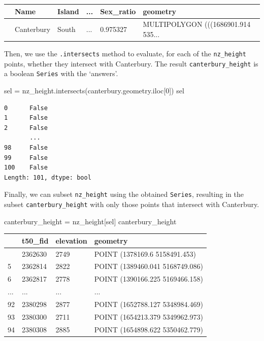 \documentclass[
  letterpaper,
]{krantz}
\newenvironment{Shaded}{\begin{snugshade}}{\end{snugshade}}
\newcommand{\DecValTok}[1]{\textcolor[rgb]{0.68,0.00,0.00}{#1}}
\newcommand{\NormalTok}[1]{\textcolor[rgb]{0.00,0.23,0.31}{#1}}
\newcommand{\OperatorTok}[1]{\textcolor[rgb]{0.37,0.37,0.37}{#1}}
\begin{document}
\begin{longtable}[]{@{}llllll@{}}
\toprule\noalign{}
& Name & Island & ... & Sex\_ratio & geometry \\
\midrule\noalign{}
\endhead
\bottomrule\noalign{}
\endlastfoot
10 & Canterbury & South & ... & 0.975327 & MULTIPOLYGON (((1686901.914
535... \\
\end{longtable}

Then, we use the \texttt{.intersects} method to evaluate, for each of
the \texttt{nz\_height} points, whether they intersect with Canterbury.
The result \texttt{canterbury\_height} is a boolean \texttt{Series} with
the `answers'.

\begin{Shaded}
\begin{Highlighting}[]
\NormalTok{sel }\OperatorTok{=}\NormalTok{ nz\_height.intersects(canterbury.geometry.iloc[}\DecValTok{0}\NormalTok{])}
\NormalTok{sel}
\end{Highlighting}
\end{Shaded}

\begin{verbatim}
0      False
1      False
2      False
       ...  
98     False
99     False
100    False
Length: 101, dtype: bool
\end{verbatim}

Finally, we can subset \texttt{nz\_height} using the obtained
\texttt{Series}, resulting in the subset \texttt{canterbury\_height}
with only those points that intersect with Canterbury.

\begin{Shaded}
\begin{Highlighting}[]
\NormalTok{canterbury\_height }\OperatorTok{=}\NormalTok{ nz\_height[sel]}
\NormalTok{canterbury\_height}
\end{Highlighting}
\end{Shaded}

\begin{longtable}[]{@{}llll@{}}
\toprule\noalign{}
& t50\_fid & elevation & geometry \\
\midrule\noalign{}
\endhead
\bottomrule\noalign{}
\endlastfoot
4 & 2362630 & 2749 & POINT (1378169.6 5158491.453) \\
5 & 2362814 & 2822 & POINT (1389460.041 5168749.086) \\
6 & 2362817 & 2778 & POINT (1390166.225 5169466.158) \\
... & ... & ... & ... \\
92 & 2380298 & 2877 & POINT (1652788.127 5348984.469) \\
93 & 2380300 & 2711 & POINT (1654213.379 5349962.973) \\
94 & 2380308 & 2885 & POINT (1654898.622 5350462.779) \\
\end{longtable}
\end{document}
